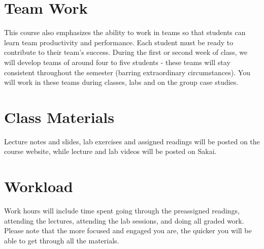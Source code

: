 \documentclass[11pt, a4paper]{article}
\begin{document}
\section{Team Work}
This course also emphasizes the ability to work in teams so that students can learn team productivity and performance. Each student must be ready to contribute to their team's success. During the first or second week of class, we will develop teams of around four to five students - these teams will stay consistent throughout the semester (barring extraordinary circumstances). You will work in these teams during classes, labs and on the group case studies.


\section{Class Materials}
Lecture notes and slides, lab exercises and assigned readings will be posted on the course website, while lecture and lab videos will be posted on Sakai. %

\section{Workload}
Work hours will include time spent going through the preassigned readings, attending the lectures, attending the lab sessions, and doing all graded work. Please note that the more focused and engaged you are, the quicker you will be able to get through all the materials.
\end{document}
